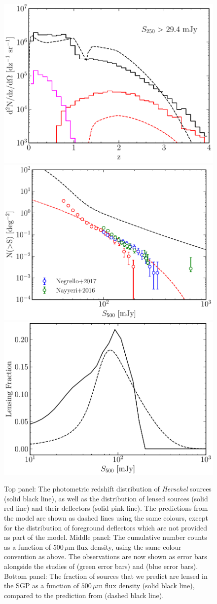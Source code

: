 \begin{figure}
    \centering
    \includegraphics[width=0.55\columnwidth,height=0.255\textheight]{Figures/lens_redshift_distribution.pdf}
    \includegraphics[width=0.55\columnwidth,height=0.255\textheight]{Figures/lens_number_counts.pdf}
    \includegraphics[width=0.55\columnwidth,height=0.255\textheight]{Figures/lensing_fraction.pdf}
    \caption[Comparison of our unlensed and lensed galaxy populations]{Top panel: The photometric redshift distribution of \textit{Herschel} sources (solid black line), as well as the distribution of lensed sources (solid red line) and their deflectors (solid pink line). The predictions from the \citealt{Cai_2013} model are shown as dashed lines using the same colours, except for the distribution of foreground deflectors which are not provided as part of the model. Middle panel: The cumulative number counts as a function of $500\,\mu$m flux density, using the same colour convention as above. The observations are now shown as error bars alongside the studies of \citealt{Nayyeri_2016} (green error bars) and \citealt{Negrello_2017} (blue error bars). Bottom panel: The fraction of sources that we predict are lensed in the SGP as a function of $500\,\mu$m flux density (solid black line), compared to the prediction from \citealt{Cai_2013} (dashed black line).
    \label{fig:lens_distributions_against_cai}}
\end{figure}

